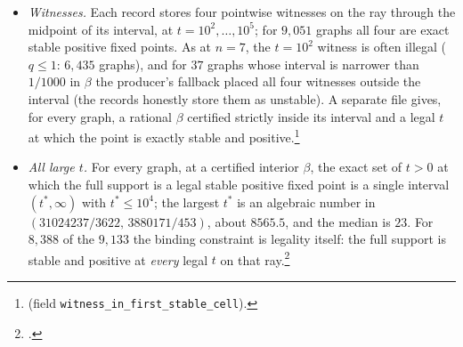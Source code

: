 \documentclass[11pt]{article}
\theoremstyle{definition}
\begin{document}
\begin{itemize}
blow-ups (one node doubled, Lemma~\ref{lem:W}); exactly $61$ of them, from $52$ parents, are in the list, and the other
$797$ are not limit counterexamples (prefilter: $690$ dropped, $47$ B, $60$ never in the limit stage), and none is stable and positive at $4{,}782$ sampled legal points inside its parent's interval. So $9{,}072$ of the $9{,}133$ are not
single closed-twin lifts of a seven-node counterexample. Lemma~\ref{lem:W} transfers the fixed-point data of the weighted
quotient, not the region: $46$ of the $61$ lifts have an interval different from their parent's, one of them disjoint
(\dsix+&G^z~Vwn?zBRw+). Conversely, $125$ graphs in the list have a closed-twin pair whose contraction is \emph{not} a
counterexample ($114$ of these contractions are not even strict seven-node survivors). All $626$ eight-node members of the
clique-class catalogue of Section~\ref{sec:families} ($593$ distinct graphs) are in the list, an independent recall
check on the proved families (it cannot detect graphs outside them); $F_2$ of Theorem~\ref{thm:famF} is among them with its interval ending at the plastic
number, as proved. The $15$ graphs satisfying Lemma~\ref{lem:Bmech} ($E_1$ of Theorem~\ref{thm:famE} is one of them) have $\alpha=-1/2$
and are absent, as they must be.\footnote{Lifts, switches and catalogue membership: 
(\texttt{lifts}, \texttt{lemma\_J\_switch\_closure\_second\_campaign}), ,
, , .}
\item \emph{Witnesses.} Each record stores four pointwise witnesses on the ray through the midpoint of its interval, at
$t=10^2,\dots,10^5$; for $9{,}051$ graphs all four are exact stable positive fixed points. As at $n=7$, the $t=10^2$
witness is often illegal ($q\le1$: $6{,}435$ graphs), and for $37$ graphs whose interval is narrower than $1/1000$ in
$\beta$ the producer's fallback placed all four witnesses outside the interval (the records honestly store them as
unstable). A separate file gives, for every graph, a rational $\beta$ certified strictly inside its interval and a legal
$t$ at which the point is exactly stable and positive.\footnote{
(field \texttt{witness\_in\_first\_stable\_cell}).}
\item \emph{All large $t$.} For every graph, at a certified interior $\beta$, the exact set of $t>0$ at which the full
support is a legal stable positive fixed point is a single interval $(t^*,\infty)$ with $t^*\le10^4$; the largest $t^*$
is an algebraic number in $(31024237/3622,\,3880171/453)$, about $8565.5$, and the median is $23$. For $8{,}388$ of the
$9{,}133$ the binding constraint is legality itself: the full support is stable and positive at \emph{every} legal $t$ on that
ray.\footnote{.}
\end{itemize}
\end{document}
